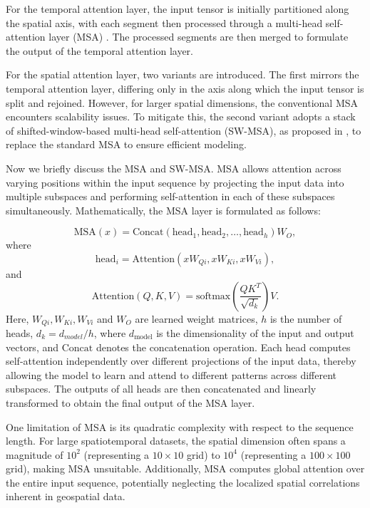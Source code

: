 \documentclass[11pt]{article}
\begin{document}
For the temporal attention layer, the input tensor is initially partitioned along the spatial axis, with each segment then processed through a multi-head self-attention layer (MSA) \citep{vaswani2017attention}. The processed segments are then merged to formulate the output of the temporal attention layer.


For the spatial attention layer, two variants are introduced. The first mirrors the temporal attention layer, differing only in the axis along which the input tensor is split and rejoined. However, for larger spatial dimensions, the conventional MSA encounters scalability issues. To mitigate this, the second variant adopts a stack of shifted-window-based multi-head self-attention (SW-MSA), as proposed in \citet{liu2021swin}, to replace the standard MSA to ensure efficient modeling.

Now we briefly discuss the MSA and SW-MSA. MSA allows attention across varying positions within the input sequence by projecting the input data into multiple subspaces and performing self-attention in each of these subspaces simultaneously. Mathematically, the MSA layer is formulated as follows:



\begin{equation}
    \text{MSA}(x) = \text{Concat}(\text{head}_1, \text{head}_2, \ldots, \text{head}_h)W_O,
\end{equation}
where 
\begin{equation}
	\text{head}_i = \text{Attention}(xW_{Qi}, xW_{Ki}, xW_{Vi}),
\end{equation}
and
\begin{equation}
    \text{Attention}(Q, K, V) = \text{softmax}\left(\frac{QK^T}{\sqrt{d_k}}\right) V.
\end{equation}
Here, $W_{Qi}, W_{Ki}, W_{Vi}$ and $W_O$ are learned weight matrices, $h$ is the number of heads, $d_k=d_{model}/h$, where $d_{\text{model}}$ is the dimensionality of the input and output vectors, and $\text{Concat}$ denotes the concatenation operation. Each head computes self-attention independently over different projections of the input data, thereby allowing the model to learn and attend to different patterns across different subspaces. The outputs of all heads are then concatenated and linearly transformed to obtain the final output of the MSA layer. 

One limitation of MSA is its quadratic complexity with respect to the sequence length. For large spatiotemporal datasets, the spatial dimension often spans a magnitude of $10^2$ (representing a $10\times 10$ grid) to $10^4$ (representing a $100 \times 100$ grid), making MSA unsuitable. Additionally, MSA computes global attention over the entire input sequence, potentially neglecting the localized spatial correlations inherent in geospatial data. 
\end{document}
